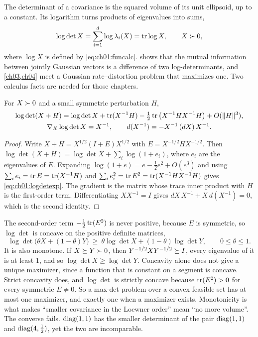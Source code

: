 The determinant of a covariance is the squared volume of its unit ellipsoid,
up to a constant. Its logarithm turns products of eigenvalues into sums,
\begin{equation}\label{eq:ch01:logdet}
\log\det X=\sum_{i=1}^d\log\lambda_i(X)=\operatorname{tr}\log X,\qquad X\succ 0,
\end{equation}
where $\log X$ is defined by \cref{eq:ch01:funcalc}.  shows that the
mutual information between jointly Gaussian vectors is a difference of two
log-determinants, and \cref{ch03,ch04} meet a Gaussian rate--distortion problem
that maximizes one. Two calculus facts are needed for those chapters.

\begin{proposition}\label{prop:ch01:logdetgrad}
For $X\succ0$ and a small symmetric perturbation $H$,
\begin{gather}
\log\det(X+H)=\log\det X+\operatorname{tr}(X^{-1}H)-\tfrac12\operatorname{tr}\big(X^{-1}HX^{-1}H\big)+O(\lVert H\rVert^3), \label{eq:ch01:logdetexp}\\
\nabla_X\log\det X=X^{-1},\qquad d(X^{-1})=-X^{-1}\,(dX)\,X^{-1}. \label{eq:ch01:logdetgrad}
\end{gather}
\end{proposition}

\begin{proof}
Write $X+H=X^{1/2}(I+E)X^{1/2}$ with $E=X^{-1/2}HX^{-1/2}$. Then
$\log\det(X+H)=\log\det X+\sum_i\log(1+e_i)$, where $e_i$ are the eigenvalues
of $E$. Expanding $\log(1+e)=e-\tfrac12e^2+O(e^3)$ and using
$\sum_ie_i=\operatorname{tr} E=\operatorname{tr}(X^{-1}H)$ and $\sum_ie_i^2=\operatorname{tr} E^2=\operatorname{tr}(X^{-1}HX^{-1}H)$
gives \cref{eq:ch01:logdetexp}. The gradient is the matrix whose trace inner
product with $H$ is the first-order term. Differentiating $XX^{-1}=I$ gives
$dX\,X^{-1}+X\,d(X^{-1})=0$, which is the second identity.
\end{proof}

The second-order term $-\tfrac12\operatorname{tr}(E^2)$ is never positive, because $E$ is
symmetric, so $\log\det$ is concave on the positive definite matrices,
\begin{equation}\label{eq:ch01:logdetconcave}
\log\det\big(\theta X+(1-\theta)Y\big)\ \ge\ \theta\log\det X+(1-\theta)\log\det Y,\qquad 0\le\theta\le1 .
\end{equation}
It is also monotone. If $X\succeq Y\succ0$, then $Y^{-1/2}XY^{-1/2}\succeq I$, every
eigenvalue of it is at least $1$, and so $\log\det X\ge\log\det Y$. Concavity
alone does not give a unique maximizer, since a function that is constant on a
segment is concave. Strict concavity does, and $\log\det$ is strictly concave
because $\operatorname{tr}(E^2)>0$ for every symmetric $E\neq0$. So a max-det problem over a
convex feasible set has at most one maximizer, and exactly one when a
maximizer exists. Monotonicity is what makes ``smaller covariance in the
Loewner order'' mean ``no more volume''. The converse fails. $\operatorname{diag}(1,1)$ has
the smaller determinant of the pair $\operatorname{diag}(1,1)$ and $\operatorname{diag}(4,\tfrac12)$, yet
the two are incomparable.

